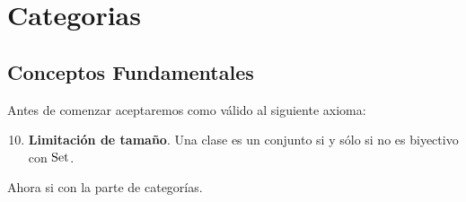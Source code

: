 \documentclass[12pt]{report}
\theoremstyle{largebreak}
\begin{document}
    \chapter{Categorias}

    \section{Conceptos Fundamentales}

    Antes de comenzar aceptaremos como válido al siguiente axioma:

    \renewcommand{\theenumi}{A\arabic{enumi}}

    \begin{enumerate}
        \setcounter{enumi}{9}
        \item \textbf{Limitación de tamaño}. Una clase es un conjunto si y sólo si no es biyectivo con $\textup{Set}$.
    \end{enumerate}

    Ahora si con la parte de categorías.
    
    \renewcommand{\theenumi}{\arabic{enumi}}
\end{document}
